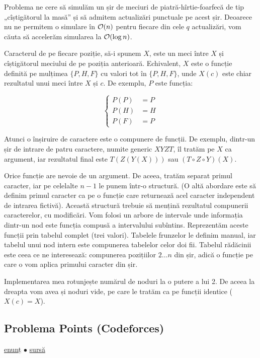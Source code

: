 \documentclass[../main.tex]{subfiles}
\begin{document}
Problema ne cere să simulăm un șir de meciuri de piatră-hîrtie-foarfecă de tip „cîștigătorul la masă” și să admitem actualizări punctuale pe acest șir. Deoarece nu ne permitem o simulare în $\mathcal{O}(n)$ pentru fiecare din cele $q$ actualizări, vom căuta să accelerăm simularea la $\mathcal{O}(\log n)$.

Caracterul de pe fiecare poziție, să-i spunem $X$, este un meci între $X$ și cîștigătorul meciului de pe poziția anterioară. Echivalent, $X$ este o funcție definită pe mulțimea $\{P, H, F\}$ cu valori tot în $\{P, H, F\}$, unde $X(c)$ este chiar rezultatul unui meci între $X$ și $c$. De exemplu, $P$ este funcția:

$$
\begin{cases}
P(P) & = P \\
P(H) & = H \\
P(F) & = P
\end{cases}
$$

Atunci o înșiruire de caractere este o compunere de funcții. De exemplu, dintr-un șir de intrare de patru caractere, numite generic $XYZT$, îl tratăm pe $X$ ca argument, iar rezultatul final este $T(Z(Y(X)))$ sau $(T \circ Z \circ Y)(X)$.

Orice funcție are nevoie de un argument.  De aceea, tratăm separat primul caracter, iar pe celelalte $n-1$ le punem într-o structură. (O altă abordare este să definim primul caracter ca pe o funcție care returnează acel caracter independent de intrarea fictivă). Această structură trebuie să mențină rezultatul compunerii caracterelor, cu modificări. Vom folosi un arbore de intervale unde informația dintr-un nod este funcția compusă a intervalului subîntins. Reprezentăm aceste funcții prin tabelul complet (trei valori). Tabelele frunzelor le definim manual, iar tabelul unui nod intern este compunerea tabelelor celor doi fii. Tabelul rădăcinii este ceea ce ne interesează: compunerea pozițiilor $2 \dots n$ din șir, adică o funcție pe care o vom aplica primului caracter din șir.

Implementarea mea rotunjește numărul de noduri la o putere a lui 2. De aceea la dreapta vom avea și noduri vide, pe care le tratăm ca pe funcții identice ($X(c) = X$).

\subsection{Problema Points (Codeforces)}
\label{problem:points}

\href{https://codeforces.com/contest/19/problem/D}{enunț}
$\bullet$
\hyperref[code:points]{sursă}
\end{document}
